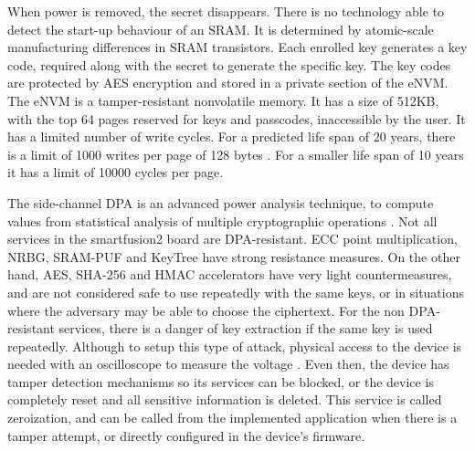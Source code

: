 When power is removed, the secret disappears. There is no technology able to detect the start-up behaviour of an SRAM. It is determined by atomic-scale manufacturing differences in SRAM transistors.
Each enrolled key generates a key code, required along with the secret to generate the specific key.
The key codes are protected by \ac{AES} encryption and stored in a private section of the eNVM.
The eNVM is a tamper-resistant nonvolatile memory. It has a size of 512KB, with the top 64 pages reserved for keys and passcodes, inaccessible by the user.
It has a limited number of write cycles. For a predicted life span of 20 years, there is a limit of 1000 writes per page of 128 bytes \cite{smartfusionDatasheet}. For a smaller life span of 10 years it has a limit of 10000 cycles per page.

The side-channel \ac{DPA} is an advanced power analysis technique, to compute values from statistical analysis of multiple cryptographic operations \cite{kocher1999differential}.
Not all services in the smartfusion2 board are \ac{DPA}-resistant. ECC point multiplication, \ac{NRBG}, SRAM-PUF and KeyTree have strong resistance measures.
On the other hand, AES, SHA-256 and HMAC accelerators have very light countermeasures, and are not considered safe to use repeatedly with the same keys, or in situations where the adversary may be able to choose the ciphertext.
For the non \ac{DPA}-resistant services, there is a danger of key extraction if the same key is used repeatedly.
Although to setup this type of attack, physical access to the device is needed with an oscilloscope to measure the voltage \cite{dpaKocher2011}. Even then, the device has tamper detection mechanisms so its services can be blocked, or the device is completely reset and all sensitive information is deleted.
This service is called zeroization, and can be called from the implemented application when there is a tamper attempt, or directly configured in the device's firmware.

